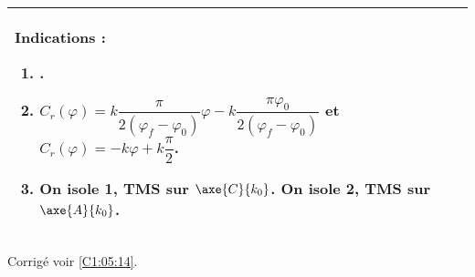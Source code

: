 \ifprof
\else
\footnotesize
\begin{center}
\begin{tabular}{|p{.9\linewidth}|}
\hline
Indications :
\begin{enumerate}
\item .
\item $C_r(\varphi)= k \dfrac{\pi}{2 \left(\varphi_f  -\varphi_0\right)}\varphi - k \dfrac{\pi \varphi_0}{2 \left(\varphi_f  -\varphi_0\right)} $ et 
$C_r(\varphi)= -k \varphi + k \dfrac{\pi}{2} $.
\item On isole 1, TMS sur $\axe{C}{k_0}$. On isole 2, TMS sur $\axe{A}{k_0}$.
\end{enumerate} \\ \hline
\end{tabular}
\end{center}
\normalsize

\begin{flushright}
\footnotesize{Corrigé  voir \ref{C1:05:14}.}
\end{flushright}%
\fi